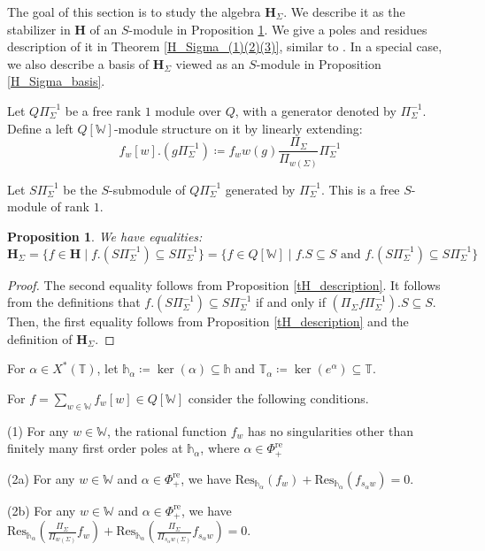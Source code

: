 \documentclass[11pt]{article}
\renewcommand{\H}{\textbf{H}}
\newcommand{\1}{\mathbb{1}}
\renewcommand{\th}{\mathbb{h}}
\newcommand{\tW}{\mathbb{W}}
\newcommand{\tT}{\mathbb{T}}
\newcommand{\Res}{\text{Res}}
\newcommand{\bbPhire}{\mathbb{\Phi}^\text{re}}
\renewcommand{\subset}{\subseteq}
\newtheorem{proposition}[theorem]{Proposition}
\theoremstyle{definition}
\numberwithin{equation}{section}
\begin{document}
The goal of this section is to study the algebra $\H_\Sigma$. We describe it as the stabilizer in $\H$ of an $S$-module in Proposition \ref{H_Sigma_is_normalizer}. We give a poles and residues description of it in Theorem \ref{H_Sigma_(1)(2)(3)}, similar to \cite{GKV}. In a special case, we also describe a basis of $\H_\Sigma$ viewed as an $S$-module in Proposition \ref{H_Sigma_basis}.


Let $Q \Pi_\Sigma^{-1}$ be a free rank $1$ module over $Q$, with a generator denoted by $\Pi_\Sigma^{-1}$. Define a left $Q[\tW]$-module structure on it by linearly extending:
$$f_w [w] . (g \Pi_\Sigma^{-1}) \coloneqq f_w w(g) \frac{\Pi_\Sigma}{\Pi_{w(\Sigma)}} \Pi_\Sigma^{-1}$$

\noindent Let $S \Pi_\Sigma^{-1}$ be the $S$-submodule of $Q \Pi_{\Sigma}^{-1}$ generated by $\Pi_{\Sigma}^{-1}$. This is a free $S$-module of rank $1$.

\begin{proposition}
\label{H_Sigma_is_normalizer}
We have equalities:
$$\H_\Sigma = \{ f \in \H \mid f.(S \Pi_\Sigma^{-1}) \subset S \Pi_\Sigma^{-1} \} = \{ f \in Q[\tW] \mid f.S \subset S \text{ and } f.(S \Pi_\Sigma^{-1}) \subset S \Pi_\Sigma^{-1}\}$$
\end{proposition}

\begin{proof}
    The second equality follows from Proposition \ref{tH_description}. It follows from the definitions that $f.(S \Pi_{\Sigma}^{-1}) \subset S \Pi_\Sigma^{-1}$ if and only if $(\Pi_\Sigma f \Pi_{\Sigma}^{-1}).S \subset S$. Then, the first equality follows from Proposition \ref{tH_description} and the definition of $\H_\Sigma$.
\end{proof}

For $\alpha \in X^*(\tT)$, let $\mathbb{h}_{\alpha} \coloneqq \ker(\alpha) \subset \mathbb{h}$ and $\tT_\alpha \coloneqq \ker(e^\alpha) \subset\tT$.

For $f = \sum_{w\in \tW} f_w [w]\in Q[\tW]$ consider the following conditions.

(1) For any $w\in \tW$, the rational function $f_w$ has no singularities other than finitely many first order poles at $\th_{\alpha}$, where $\alpha \in \bbPhire_+$

(2a) For any $w\in \tW$ and $\alpha \in \bbPhire_+$, we have $\Res_{\th_{\alpha}}(f_w) + \Res_{\th_\alpha} (f_{s_{\alpha}w}) = 0$.

(2b) For any $w\in \tW$ and $\alpha \in \bbPhire_+$, we have $\Res_{\th_{\alpha}}\left(\frac{\Pi_\Sigma}{\Pi_{w(\Sigma)}}f_w\right) + \Res_{\th_\alpha} \left(\frac{\Pi_\Sigma}{\Pi_{s_\alpha w(\Sigma)}}f_{s_{\alpha}w}\right) = 0$.
\end{document}
